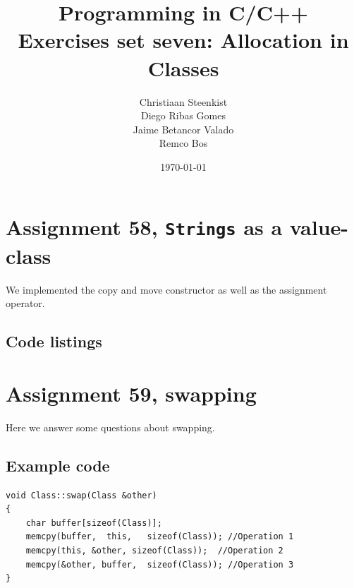 \documentclass[11pt]{article}
\begin{document}
\title{Programming in C/C++ \\
       Exercises set seven: Allocation in Classes
}
\date{\today}
\author{Christiaan Steenkist \\
Diego Ribas Gomes \\
Jaime Betancor Valado \\
Remco Bos \\
}

\maketitle

\section*{Assignment 58, \texttt{Strings} as a value-class}
We implemented the copy and move constructor as well as the assignment operator.

\subsection*{Code listings}






\section*{Assignment 59, swapping}
Here we answer some questions about swapping.

\subsection*{Example code}
\begin{lstlisting}
void Class::swap(Class &other)
{
	char buffer[sizeof(Class)];
	memcpy(buffer,  this,   sizeof(Class)); //Operation 1
	memcpy(this, &other, sizeof(Class));  //Operation 2
	memcpy(&other, buffer,  sizeof(Class)); //Operation 3	
}
\end{lstlisting}
\end{document}
